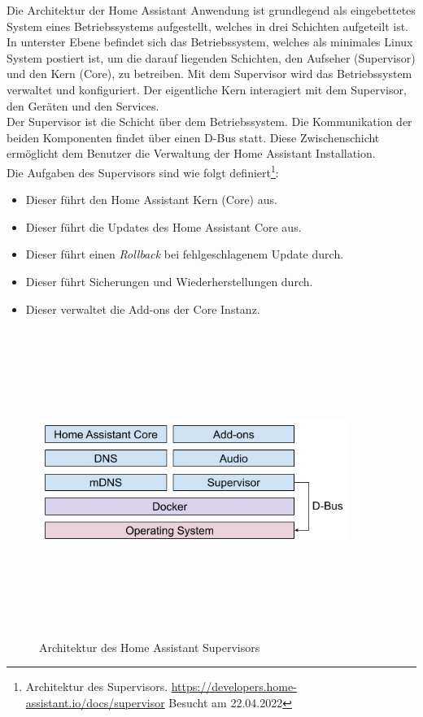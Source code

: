     Die Architektur der Home Assistant Anwendung ist grundlegend als eingebettetes System eines Betriebssystems aufgestellt, welches in 
    drei Schichten aufgeteilt ist. In unterster Ebene befindet sich das Betriebssystem, welches als minimales Linux System postiert 
    ist, um die darauf liegenden Schichten, den Aufseher (Supervisor) und den Kern (Core), zu betreiben. Mit dem Supervisor wird das 
    Betriebssystem verwaltet und konfiguriert. Der eigentliche Kern interagiert mit dem Supervisor, den Geräten und den Services. 
    \\
    \linebreak
    Der Supervisor ist die Schicht über dem Betriebssystem. Die Kommunikation der beiden Komponenten findet über einen D-Bus statt. Diese Zwischenschicht ermöglicht dem 
    Benutzer die Verwaltung der Home Assistant Installation. 
    \\
    Die Aufgaben des Supervisors sind wie folgt 
    definiert\footnote{Architektur des Supervisors. \url{https://developers.home-assistant.io/docs/supervisor} Besucht am 22.04.2022}: 
    \begin{itemize}
        \item Dieser führt den Home Assistant Kern (Core) aus.
        \item Dieser führt die Updates des Home Assistant Core aus.
        \item Dieser führt einen \textit{Rollback} bei fehlgeschlagenem Update durch.
        \item Dieser führt Sicherungen und Wiederherstellungen durch.
        \item Dieser verwaltet die Add-ons der Core Instanz.
    \end{itemize}
    \begin{figure}[hbt!]
        \centering
        \includegraphics[width=10cm,height=10cm,keepaspectratio]{images/ha_architecture_2020.png}
        \caption{Architektur des Home Assistant Supervisors \cite{haos-supervisor}}
        \label{fig:architectureHAOS}
    \end{figure}
